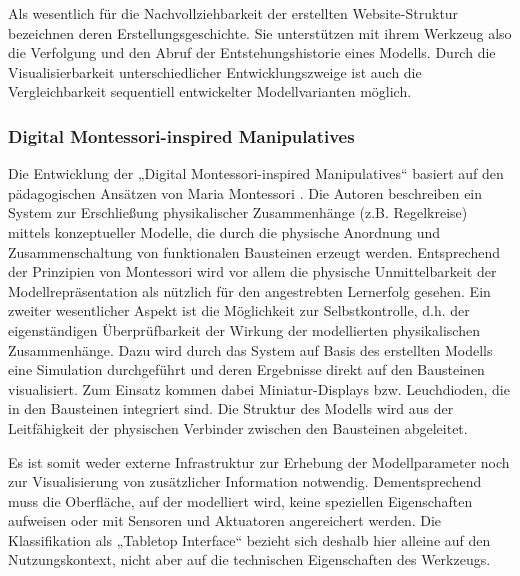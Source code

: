 Als wesentlich für die Nachvollziehbarkeit der erstellten Website-Struktur bezeichnen \citet{Klemmer02} deren Erstellungsgeschichte. Sie unterstützen mit ihrem Werkzeug also die Verfolgung und den Abruf der Entstehungshistorie eines Modells. Durch die Visualisierbarkeit unterschiedlicher Entwicklungszweige ist auch die Vergleichbarkeit sequentiell entwickelter Modellvarianten möglich. 


\subsubsection{Digital Montessori-inspired Manipulatives} %
\label{ssub:digital_montessori_inspired_manipulatives}

Die Entwicklung der „Digital Montessori-inspired Manipulatives“ \citep{Zuckerman05} basiert auf den pädagogischen Ansätzen von Maria Montessori \citep{Montessori05}. Die Autoren beschreiben ein System zur Erschließung physikalischer Zusammenhänge (z.B. Regelkreise) mittels konzeptueller Modelle, die durch die physische Anordnung und Zusammenschaltung von funktionalen Bausteinen erzeugt werden. Entsprechend der Prinzipien von Montessori wird vor allem die physische Unmittelbarkeit der Modellrepräsentation als nützlich für den angestrebten Lernerfolg gesehen. Ein zweiter wesentlicher Aspekt ist die Möglichkeit zur Selbstkontrolle, d.h. der eigenständigen Überprüfbarkeit der Wirkung der modellierten physikalischen Zusammenhänge. Dazu wird durch das System auf Basis des erstellten Modells eine Simulation durchgeführt und deren Ergebnisse direkt auf den Bausteinen visualisiert. Zum Einsatz kommen dabei Miniatur-Displays bzw. Leuchdioden, die in den Bausteinen integriert sind. Die Struktur des Modells wird aus der Leitfähigkeit der physischen Verbinder zwischen den Bausteinen abgeleitet. 

Es ist somit weder externe Infrastruktur zur Erhebung der Modellparameter noch zur Visualisierung von zusätzlicher Information notwendig. Dementsprechend muss die Oberfläche, auf der modelliert wird, keine speziellen Eigenschaften aufweisen oder mit Sensoren und Aktuatoren angereichert werden. Die Klassifikation als „Tabletop Interface“ bezieht sich deshalb hier alleine auf den Nutzungskontext, nicht aber auf die technischen Eigenschaften des Werkzeugs. 


